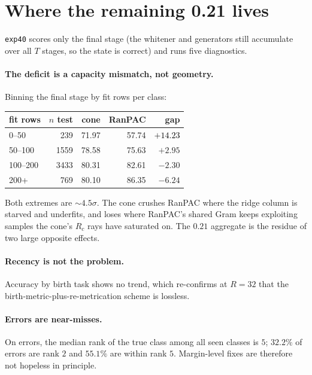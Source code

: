 \documentclass[10pt,twocolumn]{article}
\newcommand{\good}[1]{\textcolor{black}{\textbf{#1}}}
\begin{document}
\section{Where the remaining 0.21 lives}

\texttt{exp40} scores only the final stage (the whitener and generators still
accumulate over all $T$ stages, so the state is correct) and runs five
diagnostics.

\paragraph{The deficit is a capacity mismatch, not geometry.} Binning the final
stage by fit rows per class:

\begin{table}[h]\centering\small
\begin{tabular}{lrrrr}
\toprule
fit rows & $n$ test & cone & RanPAC & gap \\
\midrule
0--50    & \phantom{0}239 & 71.97 & 57.74 & \good{$+14.23$} \\
50--100  & 1559 & 78.58 & 75.63 & $+2.95$ \\
100--200 & 3433 & 80.31 & 82.61 & $-2.30$ \\
200+     & \phantom{0}769 & 80.10 & 86.35 & $-6.24$ \\
\bottomrule
\end{tabular}
\end{table}

\noindent Both extremes are $\sim4.5\sigma$. The cone crushes RanPAC where the
ridge column is starved and underfits, and loses where RanPAC's shared Gram
keeps exploiting samples the cone's $R_c$ rays have saturated on. The $0.21$
aggregate is the residue of two large opposite effects.

\paragraph{Recency is not the problem.} Accuracy by birth task shows no trend,
which re-confirms at $R{=}32$ that the birth-metric-plus-re-metrication scheme
is lossless.

\paragraph{Errors are near-misses.} On errors, the median rank of the true class
among all seen classes is $5$; $32.2\%$ of errors are rank $2$ and $55.1\%$ are
within rank $5$. Margin-level fixes are therefore not hopeless in principle.
\end{document}

